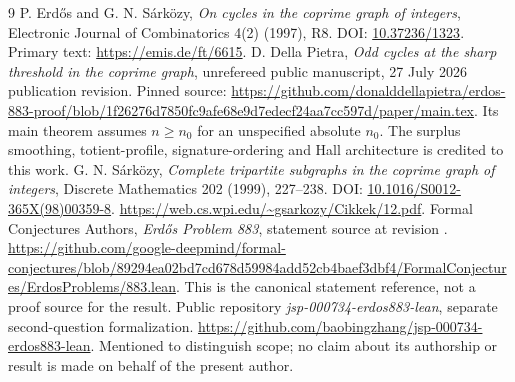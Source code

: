 \begingroup\small
\begin{thebibliography}{9}
P. Erdős and G. N. Sárközy, \emph{On cycles in the coprime graph of integers}, Electronic Journal of Combinatorics 4(2) (1997), R8. DOI: \href{https://doi.org/10.37236/1323}{10.37236/1323}. Primary text: \url{https://emis.de/ft/6615}.
D. Della Pietra, \emph{Odd cycles at the sharp threshold in the coprime graph}, unrefereed public manuscript, 27 July 2026 publication revision. Pinned source:
\url{https://github.com/donalddellapietra/erdos-883-proof/blob/1f26276d7850fc9afe68e9d7edecf24aa7cc597d/paper/main.tex}.
Its main theorem assumes $n\ge n_0$ for an unspecified absolute $n_0$. The surplus smoothing, totient-profile, signature-ordering and Hall architecture is credited to this work.
G. N. Sárközy, \emph{Complete tripartite subgraphs in the coprime graph of integers}, Discrete Mathematics 202 (1999), 227--238. DOI: \href{https://doi.org/10.1016/S0012-365X(98)00359-8}{10.1016/S0012-365X(98)00359-8}. \url{https://web.cs.wpi.edu/~gsarkozy/Cikkek/12.pdf}.
Formal Conjectures Authors, \emph{Erdős Problem 883}, statement source at revision .
\url{https://github.com/google-deepmind/formal-conjectures/blob/89294ea02bd7cd678d59984add52cb4baef3dbf4/FormalConjectures/ErdosProblems/883.lean}.
This is the canonical statement reference, not a proof source for the result.
Public repository \emph{jsp-000734-erdos883-lean}, separate second-question formalization. \url{https://github.com/baobingzhang/jsp-000734-erdos883-lean}. Mentioned to distinguish scope; no claim about its authorship or result is made on behalf of the present author.
\end{thebibliography}
\endgroup
